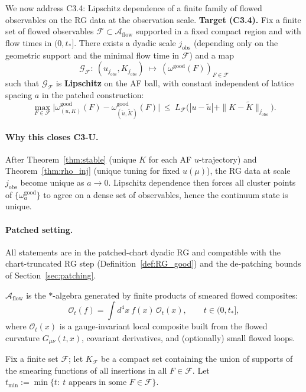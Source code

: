 We now address C3.4: Lipschitz dependence of a finite family of flowed observables on the RG data at the observation scale.
\medskip
\noindent\textbf{Target (C3.4).}
Fix a finite set of flowed observables $\mathcal F\subset\mathcal A_{\mathrm{flow}}$ supported in a fixed compact region and with flow times in $(0,t_\ast]$.
There exists a dyadic scale $j_{\mathrm{obs}}$ (depending only on the geometric support and the minimal flow time in $\mathcal F$) and a map
\[
\mathcal G_{\mathcal F}:\ (u_{j_{\mathrm{obs}}},K_{j_{\mathrm{obs}}})\ \mapsto\ (\omega^{\mathrm{good}}(F))_{F\in\mathcal F}
\]
such that $\mathcal G_{\mathcal F}$ is \textbf{Lipschitz} on the AF ball, with constant independent of lattice spacing $a$ in the patched construction:
\[
\max_{F\in\mathcal F}\big|\omega^{\mathrm{good}}_{(u,K)}(F)-\omega^{\mathrm{good}}_{(\widetilde u,\widetilde K)}(F)\big|
\ \le\ L_{\mathcal F}\Big(|u-\widetilde u|+\|K-\widetilde K\|_{j_{\mathrm{obs}}}\Big).
\]

\paragraph{Why this closes C3-U.}
After Theorem~\ref{thm:stable} (unique $K$ for each AF $u$-trajectory) and Theorem~\ref{thm:rho_inj} (unique tuning for fixed $u(\mu)$), the RG data at scale $j_{\mathrm{obs}}$ become unique as $a\to 0$.
Lipschitz dependence then forces all cluster points of $\{\omega_a^{\mathrm{good}}\}$ to agree on a dense set of observables, hence the continuum state is unique.

\paragraph{Patched setting.}
All statements are in the patched-chart dyadic RG and compatible with the chart-truncated RG step (Definition~\ref{def:RG_good}) and the de-patching bounds of Section~\ref{sec:patching}.

$\mathcal A_{\mathrm{flow}}$ is the $\ast$-algebra generated by finite products of smeared flowed composites:
\[
\mathcal O_t(f)=\int d^4x\ f(x)\,\mathcal O_t(x),\qquad t\in(0,t_\ast],
\]
where $\mathcal O_t(x)$ is a gauge-invariant local composite built from the flowed curvature $G_{\mu\nu}(t,x)$, covariant derivatives, and (optionally) small flowed loops.

Fix a finite set $\mathcal F$; let $K_{\mathcal F}$ be a compact set containing the union of supports of the smearing functions of all insertions in all $F\in\mathcal F$.
Let $t_{\min}:=\min\{t:\ t \text{ appears in some }F\in\mathcal F\}$.

